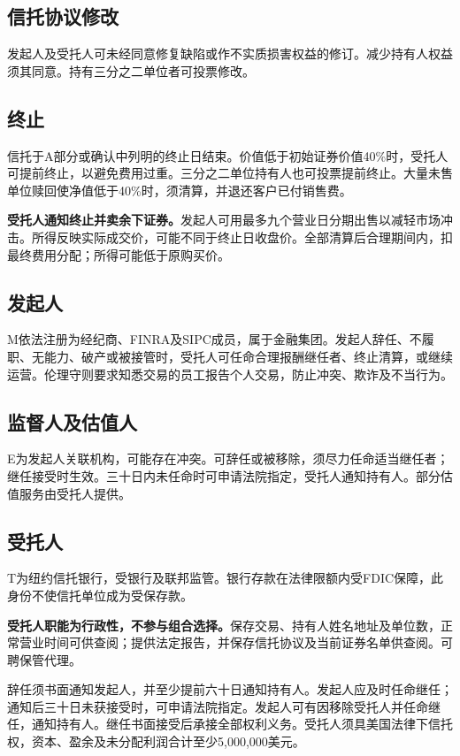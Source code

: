 \documentclass[UTF8,fontset=none,11pt,a4paper]{ctexart}
\begin{document}
\subsection*{信托协议修改}
发起人及受托人可未经同意修复缺陷或作不实质损害权益的修订。减少持有人权益须其同意。持有三分之二单位者可投票修改。


\subsection*{终止}
信托于A部分或确认中列明的终止日结束。价值低于初始证券价值40\%时，受托人可提前终止，以避免费用过重。三分之二单位持有人也可投票提前终止。大量未售单位赎回使净值低于40\%时，须清算，并退还客户已付销售费。


\textbf{受托人通知终止并卖余下证券。}发起人可用最多九个营业日分期出售以减轻市场冲击。所得反映实际成交价，可能不同于终止日收盘价。全部清算后合理期间内，扣最终费用分配；所得可能低于原购买价。


\subsection*{发起人}
M依法注册为经纪商、FINRA及SIPC成员，属于金融集团。发起人辞任、不履职、无能力、破产或被接管时，受托人可任命合理报酬继任者、终止清算，或继续运营。伦理守则要求知悉交易的员工报告个人交易，防止冲突、欺诈及不当行为。


\subsection*{监督人及估值人}
E为发起人关联机构，可能存在冲突。可辞任或被移除，须尽力任命适当继任者；继任接受时生效。三十日内未任命时可申请法院指定，受托人通知持有人。部分估值服务由受托人提供。


\subsection*{受托人}
T为纽约信托银行，受银行及联邦监管。银行存款在法律限额内受FDIC保障，此身份不使信托单位成为受保存款。


\textbf{受托人职能为行政性，不参与组合选择。}保存交易、持有人姓名地址及单位数，正常营业时间可供查阅；提供法定报告，并保存信托协议及当前证券名单供查阅。可聘保管代理。


辞任须书面通知发起人，并至少提前六十日通知持有人。发起人应及时任命继任；通知后三十日未获接受时，可申请法院指定。发起人可有因移除受托人并任命继任，通知持有人。继任书面接受后承接全部权利义务。受托人须具美国法律下信托权，资本、盈余及未分配利润合计至少5,000,000美元。
\end{document}

